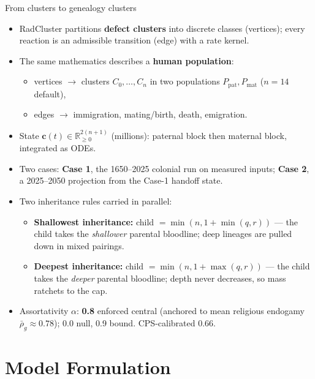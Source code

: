 \documentclass[10pt]{beamer}
\begin{document}
\begin{frame}{From clusters to genealogy clusters}
  \begin{itemize}
    \item RadCluster partitions \textbf{defect clusters} into discrete classes (vertices); every reaction is an admissible transition (edge) with a rate kernel.
    \item The same mathematics describes a \textbf{human population}:
    \begin{itemize}
      \item vertices $\to$ clusters $C_0,\dots,C_n$ in two populations $P_{\mathrm{pat}},P_{\mathrm{mat}}$ ($n{=}14$ default),
      \item edges $\to$ immigration, mating/birth, death, emigration.
    \end{itemize}
    \item State $\mathbf{c}(t)\in\mathbb{R}^{2(n+1)}_{\ge 0}$ (millions): paternal block then maternal block, integrated as ODEs.
    \item Two cases: \textbf{Case 1}, the 1650--2025 colonial run on measured inputs; \textbf{Case 2}, a 2025--2050 projection from the Case-1 handoff state.
    \item Two inheritance rules carried in parallel:
    \begin{itemize}
      \item \textbf{Shallowest inheritance:} child $=\min(n,1{+}\min(q,r))$ --- the child takes the \emph{shallower} parental bloodline; deep lineages are pulled down in mixed pairings.
      \item \textbf{Deepest inheritance:} child $=\min(n,1{+}\max(q,r))$ --- the child takes the \emph{deeper} parental bloodline; depth never decreases, so mass ratchets to the cap.
    \end{itemize}
    \item Assortativity $\alpha$: \textbf{0.8} enforced central (anchored to mean religious endogamy $\bar\rho_g{\approx}0.78$); 0.0 null, 0.9 bound. CPS-calibrated $0.66$.
  \end{itemize}
\end{frame}

\section{Model Formulation}
\end{document}
